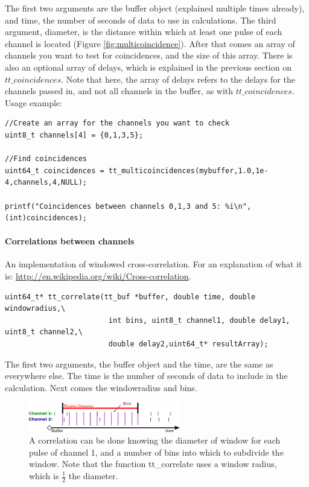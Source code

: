 \documentclass[10pt]{article}
\begin{document}
The first two arguments are the buffer object (explained multiple times already), and time, the number of seconds of data to use in calculations.
The third argument, diameter, is the distance within which at least one pulse of each channel is located (Figure \ref{fig:multicoincidence}). After
that comes an array of channels you want to test for coincidences, and the size of this array. There is also an optional array of delays, which is explained
in the previous section on $tt\_coincidences$. Note that here, the array of delays refers to the delays for the channels passed in, and not all channels
in the buffer, as with $tt\_coincidences$. Usage example:

\begin{verbatim}
//Create an array for the channels you want to check
uint8_t channels[4] = {0,1,3,5};

//Find coincidences
uint64_t coincidences = tt_multicoincidences(mybuffer,1.0,1e-4,channels,4,NULL);

printf("Coincidences between channels 0,1,3 and 5: %i\n", (int)coincidences);

\end{verbatim}

\paragraph{Correlations between channels}
An implementation of windowed cross-correlation. For an explanation of what it is: \url{http://en.wikipedia.org/wiki/Cross-correlation}.

\begin{verbatim}
uint64_t* tt_correlate(tt_buf *buffer, double time, double windowradius,\
                        int bins, uint8_t channel1, double delay1, uint8_t channel2,\
                        double delay2,uint64_t* resultArray);
\end{verbatim}

The first two arguments, the buffer object and the time, are the same as everywhere else. The time is the number of seconds of data
to include in the calculation. Next comes the windowradius and bins. 

\begin{figure}
\begin{center}
\includegraphics[width=250px]{correlation.png}
\caption{A correlation can be done knowing the diameter of window for each pulse of channel 1, and a number of bins into which to subdivide the window. Note that the function tt\_correlate uses
a window radius, which is $\frac{1}{2}$ the diameter.}
\label{fig:correlation}
\end{center}
\end{figure}
\end{document}
